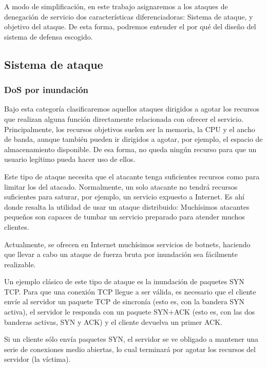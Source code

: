 A modo de simplificación, en este trabajo asignaremos a los ataques de denegación de servicio dos características 
diferenciadoras: Sistema de ataque, y objetivo del ataque. De esta forma, podremos entender el por qué del diseño del 
sistema de defensa escogido.

\subsection{Sistema de ataque}
\subsubsection{DoS por inundación} 
Bajo esta categoría clasificaremos aquellos ataques dirigidos a agotar los recursos que realizan alguna función 
directamente relacionada con ofrecer el servicio. Principalmente, los recursos objetivos suelen ser la memoria, la CPU 
y el ancho de banda, aunque también pueden ir dirigidos a agotar, por ejemplo, el espacio de almacenamiento disponible. 
De esa forma, no queda ningún recurso para que un usuario legítimo pueda hacer uso de ellos.

Este tipo de ataque necesita que el atacante tenga suficientes recursos como para limitar los del atacado. Normalmente, 
un solo atacante no tendrá recursos suficientes para saturar, por ejemplo, un servicio expuesto a Internet. Es ahí 
donde resalta la utilidad de usar un ataque distribuido: Muchísimos atacantes pequeños son capaces de tumbar un 
servicio preparado para atender muchos clientes.

Actualmente, se ofrecen en Internet muchísimos servicios de botnets, haciendo que llevar a cabo un ataque de fuerza 
bruta por inundación sea fácilmente realizable.

Un ejemplo clásico de este tipo de ataque es la inundación de paquetes \gls{SYN} \gls{TCP}. Para que una 
conexión TCP llegue a ser válida, es necesario que el cliente envíe al servidor  un paquete \gls{TCP} de 
sincronía (esto es, con la bandera \gls{SYN} activa), el servidor le responda con un paquete \gls{SYN}+\gls{ACK} (esto es, con 
las dos banderas activas, \gls{SYN} y \gls{ACK}) y el cliente  devuelva un primer \gls{ACK}.

Si un cliente sólo envía paquetes SYN, el servidor se ve obligado a mantener una serie de conexiones medio abiertas, lo 
cual terminará por agotar los recursos del servidor (la víctima).

